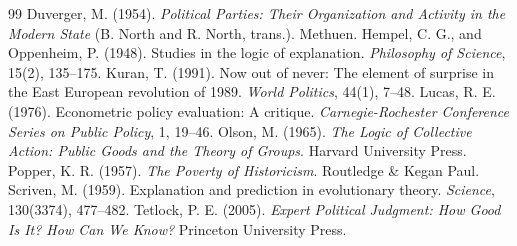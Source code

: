 \documentclass{situationist-preprint}
\begin{document}
\begin{thebibliography}{99}\small
{} Duverger, M. (1954). \emph{Political Parties: Their Organization and Activity in the Modern State} (B. North and R. North, trans.). Methuen.
 Hempel, C. G., and Oppenheim, P. (1948). Studies in the logic of explanation. \emph{Philosophy of Science}, 15(2), 135--175.
 Kuran, T. (1991). Now out of never: The element of surprise in the East European revolution of 1989. \emph{World Politics}, 44(1), 7--48.
 Lucas, R. E. (1976). Econometric policy evaluation: A critique. \emph{Carnegie-Rochester Conference Series on Public Policy}, 1, 19--46.
 Olson, M. (1965). \emph{The Logic of Collective Action: Public Goods and the Theory of Groups}. Harvard University Press.
 Popper, K. R. (1957). \emph{The Poverty of Historicism}. Routledge \& Kegan Paul.
 Scriven, M. (1959). Explanation and prediction in evolutionary theory. \emph{Science}, 130(3374), 477--482.
 Tetlock, P. E. (2005). \emph{Expert Political Judgment: How Good Is It? How Can We Know?} Princeton University Press.
\end{thebibliography}
\end{document}

